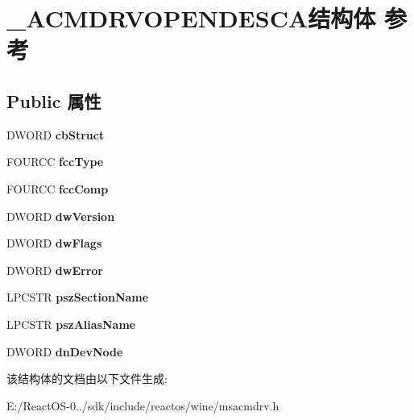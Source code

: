 \hypertarget{struct___a_c_m_d_r_v_o_p_e_n_d_e_s_c_a}{}\section{\+\_\+\+A\+C\+M\+D\+R\+V\+O\+P\+E\+N\+D\+E\+S\+C\+A结构体 参考}
\label{struct___a_c_m_d_r_v_o_p_e_n_d_e_s_c_a}
\subsection*{Public 属性}
\begin{DoxyCompactItemize}
\item 
\mbox{\label{struct___a_c_m_d_r_v_o_p_e_n_d_e_s_c_a_af9b411c891484a4dac2fcd04f0b143e1}} 
D\+W\+O\+RD {\bfseries cb\+Struct}
\item 
\mbox{\label{struct___a_c_m_d_r_v_o_p_e_n_d_e_s_c_a_a4f735dd1a68a6b8cce092dc7239b8901}} 
F\+O\+U\+R\+CC {\bfseries fcc\+Type}
\item 
\mbox{\label{struct___a_c_m_d_r_v_o_p_e_n_d_e_s_c_a_ae9dd115acc9594d76f3be6a847f2b055}} 
F\+O\+U\+R\+CC {\bfseries fcc\+Comp}
\item 
\mbox{\label{struct___a_c_m_d_r_v_o_p_e_n_d_e_s_c_a_a5a7ba2eab040e200841bec912cc167d3}} 
D\+W\+O\+RD {\bfseries dw\+Version}
\item 
\mbox{\label{struct___a_c_m_d_r_v_o_p_e_n_d_e_s_c_a_ac94f11df64ef2ec9788b5c7c9355dcef}} 
D\+W\+O\+RD {\bfseries dw\+Flags}
\item 
\mbox{\label{struct___a_c_m_d_r_v_o_p_e_n_d_e_s_c_a_a23d17f0143497657abf868a148d3e7b1}} 
D\+W\+O\+RD {\bfseries dw\+Error}
\item 
\mbox{\label{struct___a_c_m_d_r_v_o_p_e_n_d_e_s_c_a_a7e451700a89bec1bdf4279c0a699e206}} 
L\+P\+C\+S\+TR {\bfseries psz\+Section\+Name}
\item 
\mbox{\label{struct___a_c_m_d_r_v_o_p_e_n_d_e_s_c_a_aaf9bef1114f1d886df2bb50743e1183b}} 
L\+P\+C\+S\+TR {\bfseries psz\+Alias\+Name}
\item 
\mbox{\label{struct___a_c_m_d_r_v_o_p_e_n_d_e_s_c_a_a601d26171e5328b2cd7da4f9d7dd524e}} 
D\+W\+O\+RD {\bfseries dn\+Dev\+Node}
\end{DoxyCompactItemize}


该结构体的文档由以下文件生成\+:\begin{DoxyCompactItemize}
\item 
E\+:/\+React\+O\+S-\/0../sdk/include/reactos/wine/msacmdrv.\+h\end{DoxyCompactItemize}
